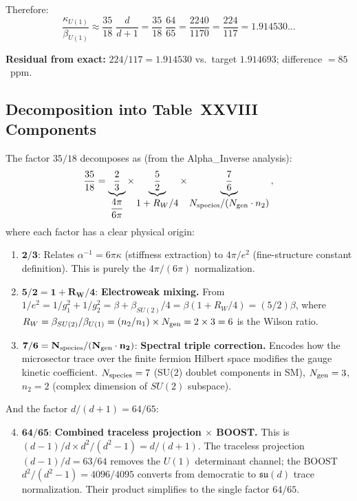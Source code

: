 \documentclass[12pt,a4paper]{article}
\begin{document}
Therefore:
\begin{equation}
\boxed{
\frac{\kappa_{U(1)}}{\beta_{U(1)}}
\approx \frac{35}{18}\;\frac{d}{d+1}
= \frac{35}{18}\;\frac{64}{65}
= \frac{2240}{1170}
= \frac{224}{117}
= 1.914530\ldots
}
\end{equation}

\textbf{Residual from exact:}
$224/117 = 1.914530$ vs.\ target $1.914693$; difference $= 85$~ppm.

\subsection{Decomposition into Table~XXVIII Components}

The factor $35/18$ decomposes as (from the Alpha\_Inverse analysis):
\begin{equation}
\frac{35}{18}
= \underbrace{\frac{2}{3}}_{\displaystyle\frac{4\pi}{6\pi}}
  \times \underbrace{\frac{5}{2}}_{\displaystyle 1 + R_W/4}
  \times \underbrace{\frac{7}{6}}_{\displaystyle N_{\rm species}/(N_{\rm gen}\cdot n_2)}\,,
\end{equation}
where each factor has a clear physical origin:

\begin{enumerate}
\item $\mathbf{2/3}$: Relates $\alpha^{-1} = 6\pi\kappa$ (stiffness
  extraction) to $4\pi/e^2$ (fine-structure constant definition).
  This is purely the $4\pi/(6\pi)$ normalization.

\item $\mathbf{5/2 = 1 + R_W/4}$: \textbf{Electroweak mixing.}
  From $1/e^2 = 1/g_1^2 + 1/g_2^2 = \beta + \beta_{SU(2)}/4
  = \beta(1 + R_W/4) = (5/2)\beta$,
  where $R_W = \beta_{SU(2)}/\beta_{U(1)} = (n_2/n_1)\times N_{\rm gen}
  = 2 \times 3 = 6$ is the Wilson ratio.

\item $\mathbf{7/6 = N_{\rm species}/(N_{\rm gen}\cdot n_2)}$:
  \textbf{Spectral triple correction.}
  Encodes how the microsector trace over the finite fermion
  Hilbert space modifies the gauge kinetic coefficient.
  $N_{\rm species} = 7$ (SU(2) doublet components in SM),
  $N_{\rm gen} = 3$, $n_2 = 2$ (complex dimension of $SU(2)$ subspace).
\end{enumerate}

And the factor $d/(d+1) = 64/65$:

\begin{enumerate}
\setcounter{enumi}{3}
\item $\mathbf{64/65}$: \textbf{Combined traceless projection $\times$ BOOST.}
  This is $(d{-}1)/d \times d^2/(d^2{-}1) = d/(d{+}1)$.
  The traceless projection $(d{-}1)/d = 63/64$ removes the
  $U(1)$ determinant channel; the BOOST $d^2/(d^2{-}1) = 4096/4095$
  converts from democratic to $\mathfrak{su}(d)$ trace normalization.
  Their product simplifies to the single factor $64/65$.
\end{enumerate}
\end{document}
